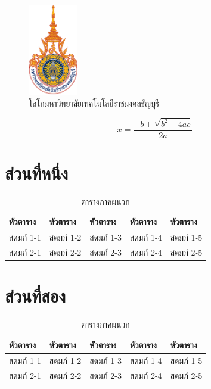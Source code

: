 \appendix
{}
\begin{figure}[ht!]
\centering
\includegraphics[height=4cm]{rmuttlogo}
\caption{โลโกมหาวิทยาลัยเทคโนโลยีราชมงคลธัญบุรี}	
\end{figure}

\begin{equation}
x =\dfrac{-b\pm\sqrt{b^2-4ac}}{2a}	
\end{equation}

\section*{ส่วนที่หนึ่ง}

\begin{table}[t]
\centering
\begin{tabular}{|l|l|l|l|l|}
\hline
หัวตาราง & หัวตาราง & หัวตาราง & หัวตาราง & หัวตาราง \\ \hline
สดมภ์ 1-1 & สดมภ์ 1-2 & สดมภ์ 1-3 & สดมภ์ 1-4 & สดมภ์ 1-5  \\ \hline 	
สดมภ์ 2-1 & สดมภ์ 2-2 & สดมภ์ 2-3 & สดมภ์ 2-4 & สดมภ์ 2-5  \\ \hline 
\end{tabular}
\caption{ตารางภาคผนวก}	
\end{table}

\section*{ส่วนที่สอง}

\begin{table}[h]
\centering
\begin{tabular}{|l|l|l|l|l|}
\hline
หัวตาราง & หัวตาราง & หัวตาราง & หัวตาราง & หัวตาราง \\ \hline
สดมภ์ 1-1 & สดมภ์ 1-2 & สดมภ์ 1-3 & สดมภ์ 1-4 & สดมภ์ 1-5  \\ \hline 	
สดมภ์ 2-1 & สดมภ์ 2-2 & สดมภ์ 2-3 & สดมภ์ 2-4 & สดมภ์ 2-5  \\ \hline 
\end{tabular}
\caption{ตารางภาคผนวก}	
\end{table}

